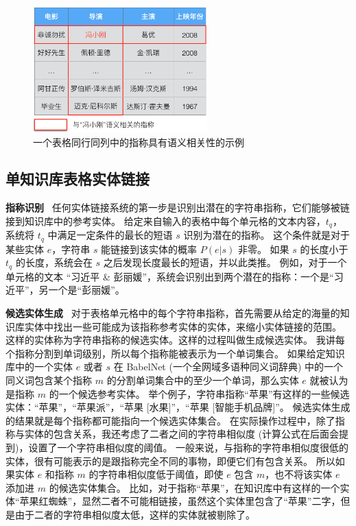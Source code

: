 \begin{figure}[htbp]
\centering
\includegraphics[width=0.6\textwidth]{img/table}
\caption{一个表格同行同列中的指称具有语义相关性的示例}
\label{table}
\end{figure}

\subsection{单知识库表格实体链接}\label{single}

\noindent\textbf{指称识别} \ 
任何实体链接系统的第一步是识别出潜在的字符串指称，它们能够被链接到知识库中的参考实体。
给定来自输入的表格中每个单元格的文本内容，$t_q$，系统将 $t_q$ 中满足一定条件的最长的短语 $s$ 识别为潜在的指称。
这个条件就是对于某些实体 $e$，字符串 $s$ 能链接到该实体的概率 $P(e|s)$ 非零。
如果 $s$ 的长度小于 $t_q$ 的长度，系统会在 $s$ 之后发现长度最长的短语，并以此类推。
例如，对于一个单元格的文本 ``习近平 \& 彭丽媛''，系统会识别出到两个潜在的指称：一个是``习近平''，另一个是``彭丽媛''。\newline


\noindent\textbf{候选实体生成} \ 
对于表格单元格中的每个字符串指称，首先需要从给定的海量的知识库实体中找出一些可能成为该指称参考实体的实体，来缩小实体链接的范围。
这样的实体称为字符串指称的候选实体。这样的过程叫做生成候选实体。
我讲每个指称分割到单词级别，所以每个指称能被表示为一个单词集合。
如果给定知识库中的一个实体 $e$ 或者 $s$ 在 BabelNet\cite{navigli2010babelnet} (一个全网域多语种同义词辞典) 中的一个同义词包含某个指称 $m$ 的分割单词集合中的至少一个单词，那么实体 $e$ 就被认为是指称 $m$ 的一个候选参考实体。
举个例子，字符串指称``苹果''有这样的一些候选实体：``苹果''，``苹果派''，``苹果 [水果]''，``苹果 [智能手机品牌]''。
候选实体生成的结果就是每个指称都可能指向一个候选实体集合。
在实际操作过程中，除了指称与实体的包含关系，我还考虑了二者之间的字符串相似度 (计算公式在后面会提到)，设置了一个字符串相似度的阈值。
一般来说，与指称的字符串相似度很低的实体，很有可能表示的是跟指称完全不同的事物，即便它们有包含关系。
所以如果实体 $e$ 和指称 $m$ 的字符串相似度低于阈值，即使 $e$ 包含 $m$，也不将该实体 $e$ 添加进 $m$ 的候选实体集合。
比如，对于指称``苹果''，在知识库中有这样的一个实体``苹果红蜘蛛''，显然二者不可能相链接，虽然这个实体里包含了``苹果''二字，但是由于二者的字符串相似度太低，这样的实体就被剔除了。
\newline

